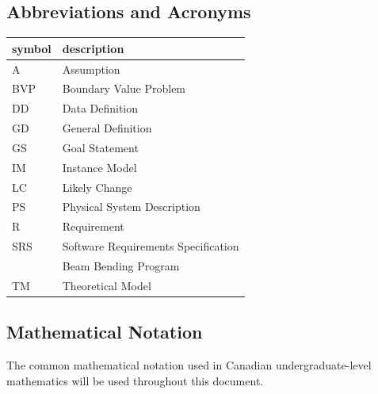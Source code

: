 \documentclass[12pt]{article}
\begin{document}
\subsection{Abbreviations and Acronyms}

\renewcommand{\arraystretch}{1.2}

\begin{center}
    \begin{tabular}{l l}
        \toprule
        \textbf{symbol} & \textbf{description}                \\
        \midrule
        A               & Assumption                          \\
        BVP             & Boundary Value Problem              \\
        DD              & Data Definition                     \\
        GD              & General Definition                  \\
        GS              & Goal Statement                      \\
        IM              & Instance Model                      \\
        LC              & Likely Change                       \\
        PS              & Physical System Description         \\
        R               & Requirement                         \\
        SRS             & Software Requirements Specification \\
        \progname{}     & Beam Bending Program                \\
        TM              & Theoretical Model                   \\
        \bottomrule
    \end{tabular}
\end{center}

\subsection{Mathematical Notation}

The common mathematical notation used in Canadian undergraduate-level
mathematics will be used throughout this document.

\newpage


\end{document}
